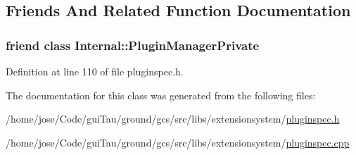 \subsection{Friends And Related Function Documentation}
\hypertarget{class_extension_system_1_1_plugin_spec_ac886620628a69def5b6d57fa12c39179}{
\subsubsection[{Internal\-::\-Plugin\-Manager\-Private}]{\setlength{\rightskip}{0pt plus 5cm}friend class {\bf Internal\-::\-Plugin\-Manager\-Private}\hspace{0.3cm}{\ttfamily [friend]}}}\label{class_extension_system_1_1_plugin_spec_ac886620628a69def5b6d57fa12c39179}


Definition at line 110 of file pluginspec.\-h.



The documentation for this class was generated from the following files\-:\begin{DoxyCompactItemize}
\item 
/home/jose/\-Code/gui\-Tau/ground/gcs/src/libs/extensionsystem/\hyperlink{pluginspec_8h}{pluginspec.\-h}\item 
/home/jose/\-Code/gui\-Tau/ground/gcs/src/libs/extensionsystem/\hyperlink{pluginspec_8cpp}{pluginspec.\-cpp}\end{DoxyCompactItemize}
